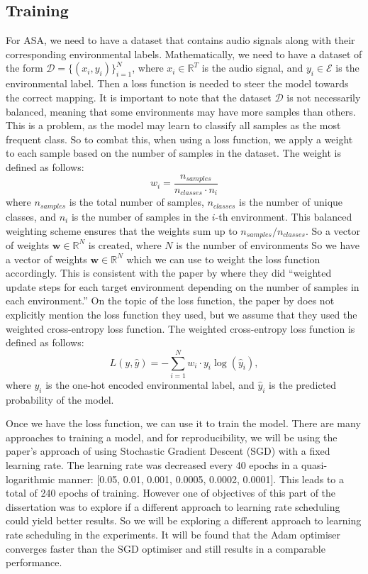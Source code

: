 \documentclass[logo,bsc,singlespacing,parskip,online]{infthesis}
\begin{document}
\subsection{Training}
For ASA, we need to have a dataset that contains audio signals along with their corresponding environmental labels. 
Mathematically, we need to have a dataset of the form \(\mathcal{D} = \{(x_i, y_i)\}_{i=1}^{N}\), where \(x_i \in \mathbb{R}^{T}\) is the audio signal, and \(y_i \in \mathcal{E}\) is the environmental label.
Then a loss function is needed to steer the model towards the correct mapping.
It is important to note that the dataset $\mathcal{D}$ is not necessarily balanced,
meaning that some environments may have more samples than others.
This is a problem, as the model may learn to classify all samples as the most frequent class. 
So to combat this, when using a loss function, we apply a weight to each sample based on the number of samples in the dataset.
The weight is defined as follows:
\[
w_i = \frac{n_{samples}}{n_{classes} \cdot n_i}
\]
where \(n_{samples}\) is the total number of samples, \(n_{classes}\) is the number of unique classes, and \(n_i\) is the number of samples in the \(i\)-th environment.
This balanced weighting scheme ensures that the weights sum up to \(n_{samples}/n_{classes}\).
So a vector of weights \(\mathbf{w} \in \mathbb{R}^{N}\) is created, where \(N\) is the number of environments
So we have a vector of weights \(\mathbf{w} \in \mathbb{R}^{N}\) which we can use to weight the loss function accordingly.
This is consistent with the paper by \citet{Huwel2020HearDS} where they did ``weighted update steps for each target environment depending on the number of samples in each environment.''
On the topic of the loss function, the paper by \citet{Huwel2020HearDS} does 
not explicitly mention the loss function they used, but we assume that they used the weighted cross-entropy loss function.
The weighted cross-entropy loss function is defined as follows:
\[
L(y, \hat{y}) = -\sum_{i=1}^{N} w_i \cdot y_i \log(\hat{y}_i),
\]
where \(y_i\) is the one-hot encoded environmental label, and \(\hat{y}_i\) is the predicted probability of the model.

Once we have the loss function, we can use it to train the model. There are many approaches to training a model,
and for reproducibility, we will be using the paper's approach of using Stochastic Gradient Descent (SGD) with a fixed learning rate.
The learning rate was decreased every 40 epochs in a quasi-logarithmic manner: [0.05, 0.01, 0.001, 0.0005, 0.0002, 0.0001].
This leads to a total of 240 epochs of training. 
However one of objectives of this part of the dissertation was to explore if a different approach to learning rate scheduling
could yield better results. So we will be exploring a different approach to learning rate scheduling in the experiments.
It will be found that the Adam optimiser converges faster than the SGD optimiser and still results in a comparable 
performance. 
\end{document}
